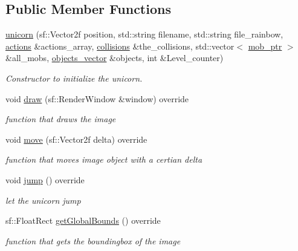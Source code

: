\subsection*{Public Member Functions}
\begin{DoxyCompactItemize}
\item 
\hyperlink{classunicorn_aa5713f2859dc51b56611d73c2c7edf48}{unicorn} (sf\+::\+Vector2f position, std\+::string filename, std\+::string file\+\_\+rainbow, \hyperlink{typedefs_8hpp_a38f93e4749e0d65d51360c429766d212}{actions} \&actions\+\_\+array, \hyperlink{typedefs_8hpp_a7e1a7f34f6d09dabb4cdafd6e4118603}{collisions} \&the\+\_\+collisions, std\+::vector$<$ \hyperlink{typedefs_8hpp_a09ee7f853fc9bc830a9445a06fd53d4b}{mob\+\_\+ptr} $>$ \&all\+\_\+mobs, \hyperlink{typedefs_8hpp_a6c0fdb1dfd0c34dbbdbb5dcd3c608b07}{objects\+\_\+vector} \&objects, int \&Level\+\_\+counter)
\begin{DoxyCompactList}\small\item\em Constructor to initialize the unicorn. \end{DoxyCompactList}\item 
void \hyperlink{classunicorn_a570c34d5669a8d2a61bdc1481e6f9dee}{draw} (sf\+::\+Render\+Window \&window) override
\begin{DoxyCompactList}\small\item\em function that draws the image \end{DoxyCompactList}\item 
void \hyperlink{classunicorn_a162f200a68342f7bc0baaf17c8cf3f9f}{move} (sf\+::\+Vector2f delta) override
\begin{DoxyCompactList}\small\item\em function that moves image object with a certian delta \end{DoxyCompactList}\item 
void \hyperlink{classunicorn_a07d5ca4e66632c0e871221a27146805a}{jump} () override
\begin{DoxyCompactList}\small\item\em let the unicorn jump \end{DoxyCompactList}\item 
sf\+::\+Float\+Rect \hyperlink{classunicorn_a1bac09fc59b04f14f5a093bc4daa04da}{get\+Global\+Bounds} () override
\begin{DoxyCompactList}\small\item\em function that gets the boundingbox of the image \end{DoxyCompactList}\item 

\end{DoxyCompactItemize}
